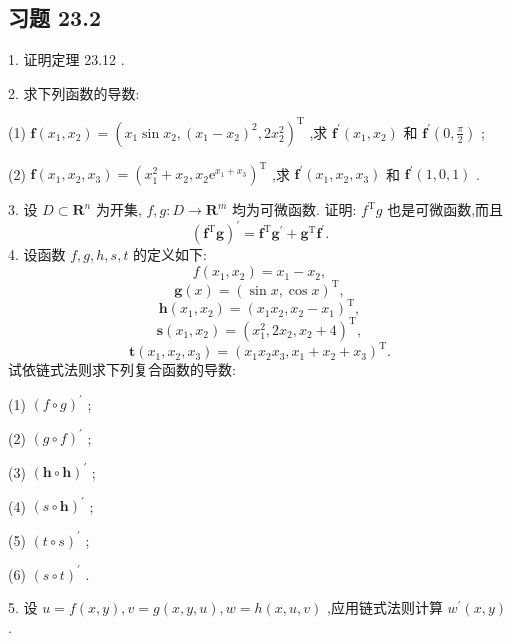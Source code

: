 \subsection{习题 23.2}

1. 证明定理 23.12 .

2. 求下列函数的导数:

(1) \(\mathbf{f}\left( {{x}_{1},{x}_{2}}\right)  = {\left( {x}_{1}\sin {x}_{2},{\left( {x}_{1} - {x}_{2}\right) }^{2},2{x}_{2}^{2}\right) }^{\mathrm{T}}\) ,求 \({\mathbf{f}}^{\prime }\left( {{x}_{1},{x}_{2}}\right)\) 和 \({\mathbf{f}}^{\prime }\left( {0,\frac{\pi }{2}}\right)\) ;

(2) \(\mathbf{f}\left( {{x}_{1},{x}_{2},{x}_{3}}\right)  = {\left( {x}_{1}^{2} + {x}_{2},{x}_{2}{\mathrm{e}}^{{x}_{1} + {x}_{3}}\right) }^{\mathrm{T}}\) ,求 \({\mathbf{f}}^{\prime }\left( {{x}_{1},{x}_{2},{x}_{3}}\right)\) 和 \({\mathbf{f}}^{\prime }\left( {1,0,1}\right)\) .

3. 设 \(D \subset  {\mathbf{R}}^{n}\) 为开集, \(f,g : D \rightarrow  {\mathbf{R}}^{m}\) 均为可微函数. 证明: \({f}^{\mathrm{T}}g\) 也是可微函数,而且
\[
{\left( {\mathbf{f}}^{\mathrm{T}}\mathbf{g}\right) }^{\prime } = {\mathbf{f}}^{\mathrm{T}}{\mathbf{g}}^{\prime } + {\mathbf{g}}^{\mathrm{T}}{\mathbf{f}}^{\prime }.
\]
4. 设函数 \(f,g,h,s,t\) 的定义如下:
\[
f\left( {{x}_{1},{x}_{2}}\right)  = {x}_{1} - {x}_{2},
\]
\[
\mathbf{g}\left( x\right)  = {\left( \sin x,\cos x\right) }^{\mathrm{T}},
\]
\[
\mathbf{h}\left( {{x}_{1},{x}_{2}}\right)  = {\left( {x}_{1}{x}_{2},{x}_{2} - {x}_{1}\right) }^{\mathrm{T}},
\]
\[
\mathbf{s}\left( {{x}_{1},{x}_{2}}\right)  = {\left( {x}_{1}^{2},2{x}_{2},{x}_{2} + 4\right) }^{\mathrm{T}},
\]
\[
\mathbf{t}\left( {{x}_{1},{x}_{2},{x}_{3}}\right)  = {\left( {x}_{1}{x}_{2}{x}_{3},{x}_{1} + {x}_{2} + {x}_{3}\right) }^{\mathrm{T}}.
\]
试依链式法则求下列复合函数的导数:

(1) \({\left( f \circ  g\right) }^{\prime }\) ;

(2) \({\left( g \circ  f\right) }^{\prime }\) ;

(3) \({\left( \mathbf{h} \circ  \mathbf{h}\right) }^{\prime }\) ;

(4) \({\left( s \circ  \mathbf{h}\right) }^{\prime }\) ;

(5) \({\left( t \circ  s\right) }^{\prime }\) ;

(6) \({\left( s \circ  t\right) }^{\prime }\) .

5. 设 \(u = f\left( {x,y}\right) ,v = g\left( {x,y,u}\right) ,w = h\left( {x,u,v}\right)\) ,应用链式法则计算 \({w}^{\prime }\left( {x,y}\right)\) .

